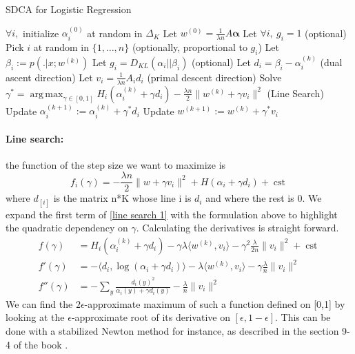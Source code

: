 \documentclass{article}
\DeclareMathOperator{\cst}{cst}
\DeclareMathOperator{\1}{\mathbb{1}}
\DeclareMathOperator*{\argmax}{arg\,max}
\begin{document}
\begin{algorithm}[ht]
    \caption{SDCA for Logistic Regression}%
    \label{sdca for logreg}
\begin{algorithmic}
        \STATE $\forall i,$ initialize $\alpha_i^{(0)}$ at random in $\Delta_K$
        \STATE Let $w^{(0)} = \frac{1}{\lambda n} A \bm \alpha$  
        \STATE Let $\forall i,\  g_i = 1$ (optional)
                \STATE Pick $i$ at random in $\{1,\ldots,n\}$ (optionally, proportional to $g_i$)
                \STATE Let $ \beta_i := p( . |x ; w^{(k)})$
                \STATE Let $g_i = D_{KL}(\alpha_i || \beta_i)$ (optional)
                \STATE Let $d_i = \beta_i - \alpha_i^{(k)}$ (dual ascent direction)
                \STATE Let $v_i = \frac{1}{\lambda n} A_i d_i $ (primal descent direction)
                \STATE Solve $\gamma^* = \argmax_{\gamma \in [0,1]} H_i(\alpha_i^{(k)} + \gamma d_i) - \frac{\lambda n}{2} \| w^{(k)} + \gamma v_i \|^2$ (Line Search)
               \STATE Update $\alpha_i^{(k+1)} := \alpha_i^{(k)} + \gamma^* d_i$
               \STATE Update $w^{(k+1)} := w^{(k)} + \gamma^* v_i $
        \ENDFOR
\end{algorithmic}
\end{algorithm}


\paragraph{Line search:} 
the function of the step size we want to maximize is 
\begin{equation}
	\label{line search 1}
	f_i(\gamma) = -\frac{\lambda n}{2} \|w + \gamma v_i\|^2 + H(\alpha_i + \gamma d_i) + \cst
\end{equation}
where $d_{[i]}$ is the matrix n*K whose line i is $d_i$ and where the rest is 0.
We expand the first term  of \ref{line search 1} with the formulation above to highlight the quadratic dependency on $\gamma$.
Calculating the derivatives is straight forward.
\begin{align*}
	f(\gamma)
	& = H_i(\alpha_i^{(k)} + \gamma d_i)
	- \gamma \lambda  \langle w^{(k)} , v_i \rangle 
	- \gamma^2 \frac{\lambda}{2n} \|v_i \|^2
	+ \cst
	\\
	f'(\gamma) & =  - \langle d_i, \log(\alpha_i + \gamma d_i) \rangle
	- \lambda  \langle w^{(k)} , v_i \rangle 
	- \gamma \frac{\lambda}{n} \|v_i \|^2 
	\\
	f''(\gamma) & = - \sum_{y} \frac{d_{i}(y)^2 }{ \alpha_i(y) + \gamma d_i(y) }
	- \frac{\lambda}{n} \|v_i \|^2 
\end{align*}
We can find the $2\epsilon$-approximate maximum of such a function defined on [0,1] by looking at the $\epsilon$-approximate root of its derivative on $[\epsilon,1-\epsilon]$.
This can be done with a stabilized Newton method for instance, as described in the section 9-4 of the book \cite{press_numerical_1992}.
\end{document}

